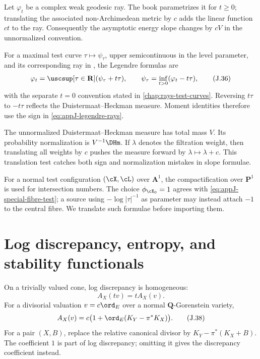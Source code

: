 Let \(\varphi_t\) be a complex weak geodesic ray.  The book parametrizes it
for \(t\geq0\); translating the associated non-Archimedean metric by \(c\)
adds the linear function \(ct\) to the ray.  Consequently the asymptotic
energy slope changes by \(cV\) in the unnormalized convention.

For a maximal test curve \(\tau\mapsto\psi_\tau\), upper semicontinuous
in the level parameter, and its corresponding ray in ,
the Legendre formulas are
\begin{equation*}
 \varphi_t=\uscsup[\tau\in\mathbf R]
                 (\psi_\tau+t\tau),
 \qquad
 \psi_\tau=\inf_{t>0}(\varphi_t-t\tau),
 \tag{J.36}\label{eq:appJ-legendre-rays}
\end{equation*}
with the separate \(t=0\) convention stated in \cref{chap:rays-test-curves}.  Reversing
\(t\tau\) to \(-t\tau\) reflects the Duistermaat--Heckman measure.  Moment
identities therefore use the sign in \eqref{eq:appJ-legendre-rays}.

The unnormalized Duistermaat--Heckman measure has total mass \(V\).  Its
probability normalization is \(V^{-1}\DHm\).  If \(\lambda\) denotes the
filtration weight, then translating all weights by \(c\) pushes the measure
forward by \(\lambda\mapsto\lambda+c\).  This translation test catches both
sign and normalization mistakes in slope formulae.

For a normal test configuration \((\cX,\cL)\) over \(\mathbf A^1\), the
compactification over \(\mathbf P^1\) is used for intersection numbers.  The
choice \(\phi_{\cX_0}=1\) agrees with
\eqref{eq:appJ-special-fibre-test}; a source using \(-\log|\tau|^{-1}\) as
parameter may instead attach \(-1\) to the central fibre.  We translate such
formulae before importing them.

\section{Log discrepancy, entropy, and stability functionals}
\label{sec:appJ-stability}

On a trivially valued cone, log discrepancy is homogeneous:
\begin{equation*}
 A_X(tv)=tA_X(v).
 \tag{J.37}\label{eq:appJ-discrepancy-homogeneous}
\end{equation*}
For a divisorial valuation \(v=c\ord_E\) over a normal \(\mathbf Q\)-Gorenstein
variety,
\begin{equation*}
 A_X(v)=c\bigl(1+\ord_E(K_Y-\pi^*K_X)\bigr).
 \tag{J.38}\label{eq:appJ-div-discrepancy}
\end{equation*}
For a pair \((X,B)\), replace the relative canonical divisor by
\(K_Y-\pi^*(K_X+B)\).  The coefficient \(1\) is part of log discrepancy;
omitting it gives the discrepancy coefficient instead.

